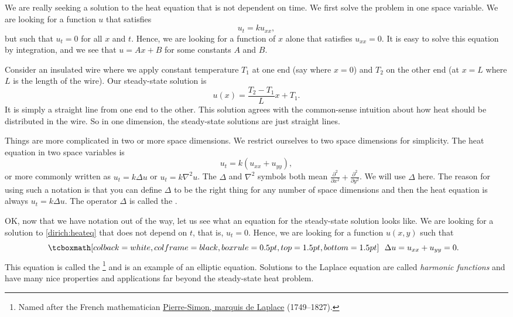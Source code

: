 We are really seeking a solution to the heat equation that is not
dependent on time.
We first solve the problem in one space variable.
We are looking for a function $u$ that satisfies
\begin{equation*}
u_t = k u_{xx} ,
\end{equation*}
but such that $u_t = 0$ for all $x$ and $t$.  Hence, we are looking for a
function of $x$ alone that satisfies $u_{xx} = 0$.  It is easy to solve this
equation by integration,
 and we see that $u = Ax+B$ for some constants $A$ and $B$.

Consider an insulated wire where we apply constant temperature $T_1$
at one end (say where $x=0$) and $T_2$ on the other end (at $x=L$ where $L$
is the length of the wire).  Our steady-state solution is
\begin{equation*}
u(x) = \frac{T_2-T_1}{L} x + T_1 .
\end{equation*}
It is simply a straight line from one end to the other.
This solution agrees with the common-sense
intuition about how heat should be
distributed in the wire.  So in one dimension, the steady-state solutions
are just straight lines.

Things are more complicated in two or more space dimensions.
We restrict ourselves to two space dimensions for simplicity.
The heat equation in two
space variables is
\begin{equation} \label{dirich:heateq}
u_t = k(u_{xx} + u_{yy}) ,
\end{equation}
or more commonly written as
$u_t = k \Delta u$ or
$u_t = k \nabla^2 u$.  The $\Delta$ and $\nabla^2$ symbols
both mean $\frac{\partial^2}{\partial x^2} +
\frac{\partial^2}{\partial y^2}$.  We will use $\Delta$ here.
The reason for using such a notation is that you
can define $\Delta$ to be the right thing for any number of space
dimensions and then the heat equation is always
$u_t = k \Delta u$.  The operator $\Delta$ is called the \emph{}.

OK\@, now that we have notation out of the way, let us see what an equation
for the steady-state solution looks like.  We are looking for a solution to
\eqref{dirich:heateq} that does not depend on $t$, that is,
$u_t = 0$.
Hence, we are looking for a
function $u(x,y)$ such that
\begin{equation*}
\mybxbg{~~
\Delta u = 
u_{xx} + u_{yy} = 0 .
~~}
\end{equation*}
This equation is called the \emph{}%
\footnote{Named after the French mathematician
\href{https://en.wikipedia.org/wiki/Laplace}{Pierre-Simon, marquis de Laplace}
(1749--1827).} and is an example of an elliptic equation.
Solutions to the Laplace equation
are called \emph{harmonic functions}
and have many nice properties and
applications far beyond the steady-state heat problem.

